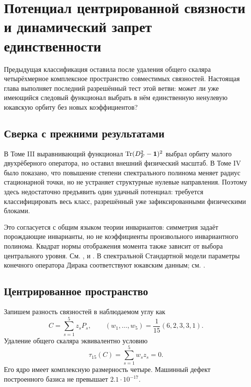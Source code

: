 \chapter{Потенциал центрированной связности и динамический запрет единственности}

Предыдущая классификация оставила после удаления общего скаляра
четырёхмерное комплексное пространство совместимых связностей. Настоящая
глава выполняет последний разрешённый тест этой ветви: может ли уже
имеющийся следовый функционал выбрать в нём единственную ненулевую
юкавскую орбиту без новых коэффициентов?

\section{Сверка с прежними результатами}

В Томе III выравнивающий функционал
\(\operatorname{Tr}(D_F^2-\mathbf 1)^2\) выбрал орбиту малого двухрёберного оператора, но
оставил внешний физический масштаб. В Томе IV было показано, что повышение
степени спектрального полинома меняет радиус стационарной точки, но не
устраняет структурные нулевые направления. Поэтому здесь недостаточно
предъявить один удачный потенциал: требуется классифицировать весь класс,
разрешённый уже зафиксированными физическими блоками.

Это согласуется с общим языком теории инвариантов: симметрия задаёт
порождающие инварианты, но не коэффициенты произвольного инвариантного
полинома. Квадрат нормы отображения момента также зависит от выбора
центрального уровня. См. ,
 и . В спектральной
Стандартной модели параметры конечного оператора Дирака соответствуют
юкавским данным; см. .

\section{Центрированное пространство}

Запишем разность связностей в наблюдаемом углу как
\begin{equation}
 C=\sum_{s=1}^{5}z_sP_s,
 \qquad
 (w_1,\ldots,w_5)=\frac1{15}(6,2,3,3,1).
\end{equation}
Удаление общего скаляра эквивалентно условию
\begin{equation}
 \tau_{15}(C)=\sum_{s=1}^{5}w_sz_s=0.
 \label{eq:v5-centered-connection-constraint}
\end{equation}
Его ядро имеет комплексную размерность четыре. Машинный дефект построенного
базиса не превышает \(2.1\cdot10^{-17}\).

